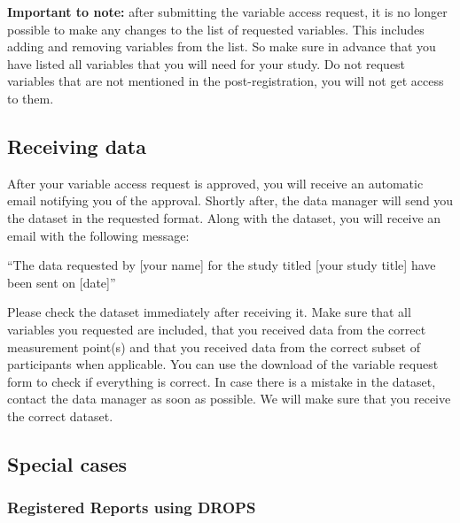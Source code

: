 \documentclass[
]{article}
\begin{document}
\textbf{Important to note:} after submitting the variable access
request, it is no longer possible to make any changes to the list of
requested variables. This includes adding and removing variables from
the list. So make sure in advance that you have listed all variables
that you will need for your study. Do not request variables that are not
mentioned in the post-registration, you will not get access to them.

\hypertarget{receiving-data}{%
\subsection{Receiving data}\label{receiving-data}}

After your variable access request is approved, you will receive an
automatic email notifying you of the approval. Shortly after, the data
manager will send you the dataset in the requested format. Along with
the dataset, you will receive an email with the following message:

``The data requested by {[}your name{]} for the study titled {[}your
study title{]} have been sent on {[}date{]}''

Please check the dataset immediately after receiving it. Make sure that
all variables you requested are included, that you received data from
the correct measurement point(s) and that you received data from the
correct subset of participants when applicable. You can use the download
of the variable request form to check if everything is correct. In case
there is a mistake in the dataset, contact the data manager as soon as
possible. We will make sure that you receive the correct dataset.

\hypertarget{section-4}{%
\subsection{}\label{section-4}}

\hypertarget{special-cases}{%
\subsection{Special cases}\label{special-cases}}

\hypertarget{section-5}{%
\subsubsection{}\label{section-5}}

\hypertarget{registered-reports-using-drops}{%
\subsubsection{Registered Reports using
DROPS}\label{registered-reports-using-drops}}
\end{document}
